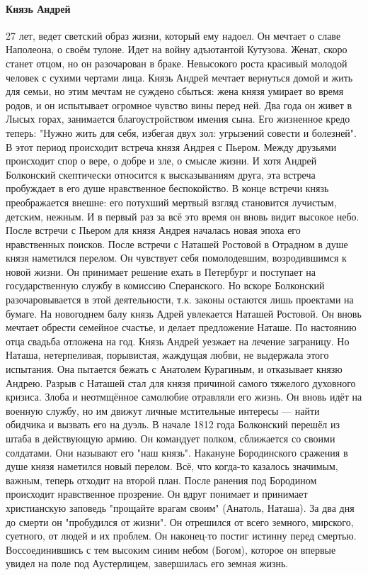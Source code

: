 \documentclass{article}
\begin{document}
\paragraph{Князь Андрей}
27 лет, ведет светский образ жизни, который ему надоел. Он мечтает о славе Наполеона, о своём тулоне.
Идет на войну адъютантой Кутузова. Женат, скоро станет отцом, но он разочарован в браке. Невысокого роста
красивый молодой человек с сухими чертами лица. Князь Андрей мечтает вернуться домой и жить для семьи, но
этим мечтам не суждено сбыться: жена князя умирает во время родов, и он испытывает огромное чувство вины перед ней.
Два года он живет в Лысых горах, занимается благоустройством имения сына. Его жизненное кредо теперь:
"Нужно жить для себя, избегая двух зол: угрызений совести и болезней". В этот период происходит встреча князя
Андрея с Пьером. Между друзьями происходит спор о вере, о добре и зле, о смысле жизни. И хотя Андрей Болконский
скептически относится к высказываниям друга, эта встреча пробуждает в его душе нравственное беспокойство.
В конце встречи князь преображается внешне: его потухший мертвый взгляд становится лучистым, детским, нежным.
И в первый раз за всё это время он вновь видит высокое небо. После встречи с Пьером для князя Андрея началась
новая эпоха его нравственных поисков. После встречи с Наташей Ростовой в Отрадном в душе князя наметился перелом.
Он чувствует себя помолодевшим, возродившимся к новой жизни. Он принимает решение ехать в Петербург и поступает
на государственную службу в комиссию Сперанского. Но вскоре Болконский разочаровывается в этой деятельности, т.к.
законы остаются лишь проектами на бумаге. На новогоднем балу князь Адрей увлекается Наташей Ростовой.
Он вновь мечтает обрести семейное счастье, и делает предложение Наташе. По настоянию отца свадьба отложена на год.
Князь Андрей уезжает на лечение заграницу. Но Наташа, нетерпеливая, порывистая, жаждущая любви, не выдержала этого
испытания. Она пытается бежать с Анатолем Курагиным, и отказывает князю Андрею. Разрыв с Наташей стал для князя
причиной самого тяжелого духовного кризиса. Злоба и неотмщённое самолюбие отравляли его жизнь. Он вновь идёт на
военную службу, но им движут личные мстительные интересы --- найти обидчика и вызвать его на дуэль.
В начале 1812 года Болконский перешёл из штаба в действующую армию. Он командует полком, сближается со своими
солдатами. Они называют его "наш князь". Накануне Бородинского сражения в душе князя наметился новый перелом.
Всё, что когда-то казалось значимым, важным, теперь отходит на второй план. После ранения под Бородином происходит
нравственное прозрение. Он вдруг понимает и принимает христианскую заповедь "прощайте врагам своим" (Анатоль, Наташа).
За два дня до смерти он "пробудился от жизни". Он отрешился от всего земного, мирского, суетного, от людей и их
проблем. Он наконец-то постиг истинну перед смертью. Воссоединившись с тем высоким синим небом (Богом), которое он
впервые увидел на поле под Аустерлицем, завершилась его земная жизнь.
\end{document}

